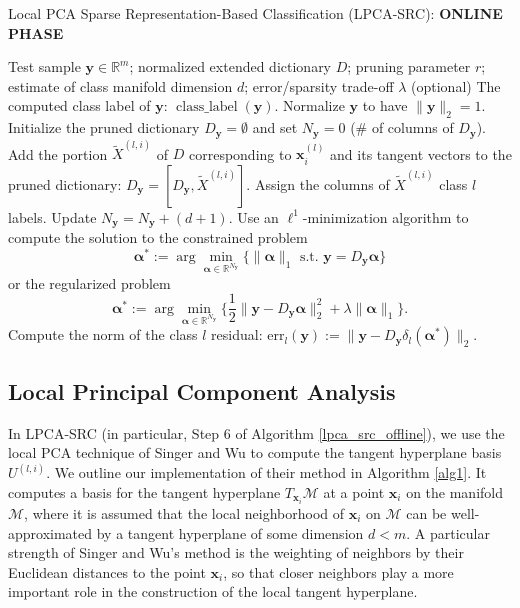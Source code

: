 \documentclass[review]{elsarticle}
\newcommand{\classlabel}{\operatorname{class\_label}}
\begin{document}
\begin{algorithm}
\caption{Local PCA Sparse Representation-Based Classification (LPCA-SRC): \textbf{ONLINE PHASE}}
\label{lpca_src_online} 
\begin{algorithmic}[1]
\REQUIRE Test sample $\bm{y} \in \mathbb{R}^m$; normalized extended dictionary $D$; pruning parameter $r$; estimate of class manifold dimension $d$; error/sparsity trade-off $\lambda$ (optional)
\ENSURE The computed class label of $\bm{y}$: $\classlabel(\bm{y})$. 
\STATE Normalize $\bm{y}$ to have $\|\bm{y}\|_2 = 1$.
\STATE Initialize the pruned dictionary $D_{\bm{y}} = \emptyset$ and set $N_{\bm{y}} = 0$ (\# of columns of $D_{\bm{y}}$).
\STATE Add the portion $\tilde{X}^{(l,i)}$ of $D$ corresponding to $\bm{x}_i^{(l)}$ and its tangent vectors to the pruned dictionary: $D_{\bm{y}} = [D_{\bm{y}},\tilde{X}^{(l,i)}]$. Assign the columns of $\tilde{X}^{(l,i)}$ class $l$ labels. Update $N_{\bm{y}} = N_{\bm{y}} + (d+1)$.
\ENDIF
\ENDFOR
\ENDFOR
\STATE Use an $\ell^1$-minimization algorithm to compute the solution to the constrained problem
\begin{equation} \label{eq:l1_exact}
\bm{\alpha}^* := \arg \min_{\bm{\alpha}\in \mathbb{R}^{N_{\bm{y}}}} \big \{ \|\bm{\alpha}\|_1 \text{ s.t. } \bm{y} = D_{\bm{y}} \bm{\alpha}\big\}
\end{equation}
or the regularized problem
\begin{equation} \label{eq:l1_approx}
\bm{\alpha}^* := \arg \min_{\bm{\alpha}\in \mathbb{R}^{N_{\bm{y}}}} \Big \{ \frac{1}{2}\|\bm{y}-D_{\bm{y}} \bm{\alpha}\|_2^2+ \lambda\|\bm{\alpha}\|_1\Big\}.
\end{equation}
\STATE Compute the norm of the class $l$ residual: 
$\mathrm{err}_l(\bm{y}) := \big\|\bm{y} - D_{\bm{y}}\delta_l(\bm{\alpha}^*)\big\|_2$.
\ENDFOR
\end{algorithmic}
\end{algorithm}

\subsection{Local Principal Component Analysis}



In LPCA-SRC (in particular, Step 6 of Algorithm \ref{lpca_src_offline}), we use the local PCA technique of Singer and Wu \cite{sin:vdm} to compute the tangent hyperplane basis $U^{(l,i)}$. We outline our implementation of their method in Algorithm \ref{alg1}. It computes a basis for the tangent hyperplane $T_{\bm{x}_i}\mathscr{M}$ at a point $\bm{x}_i$ on the manifold $\mathscr{M}$, where it is assumed that the local neighborhood of $\bm{x}_i$ on $\mathscr{M}$ can be well-approximated by a tangent hyperplane of some dimension $d<m$. A particular strength of Singer and Wu's method is the weighting of neighbors by their Euclidean distances to the point $\bm{x}_i$, so that closer neighbors play a more important role in the construction of the local tangent hyperplane. 
\end{document}
